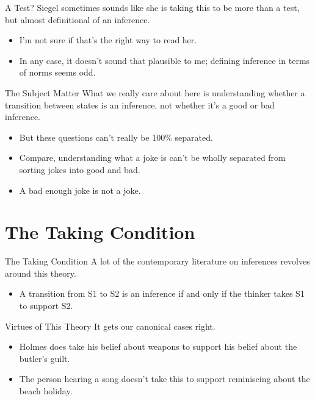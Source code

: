 \documentclass[
  17pt,
  letterpaper,
  ignorenonframetext,
  aspectratio=169,
  xcolor={dvipsnames}]{beamer}
\providecommand{\tightlist}{%
  \setlength{\itemsep}{0pt}\setlength{\parskip}{0pt}}\usepackage{longtable,booktabs,array}
\begin{document}
\begin{frame}{A Test?}
\protect\hypertarget{a-test-2}{}
Siegel sometimes sounds like she is taking this to be more than a test,
but almost definitional of an inference.

\begin{itemize}[<+->]
\tightlist
\item
  I'm not sure if that's the right way to read her.
\item
  In any case, it doesn't sound that plausible to me; defining inference
  in terms of norms seems odd.
\end{itemize}
\end{frame}

\begin{frame}{The Subject Matter}
\protect\hypertarget{the-subject-matter}{}
What we really care about here is understanding whether a transition
between states is an inference, not whether it's a good or bad
inference.

\begin{itemize}[<+->]
\tightlist
\item
  But these questions can't really be 100\% separated.
\item
  Compare, understanding what a joke is can't be wholly separated from
  sorting jokes into good and bad.
\item
  A bad enough joke is not a joke.
\end{itemize}
\end{frame}

\hypertarget{the-taking-condition}{%
\section{The Taking Condition}\label{the-taking-condition}}

\begin{frame}{The Taking Condition}
\protect\hypertarget{the-taking-condition-1}{}
A lot of the contemporary literature on inferences revolves around this
theory.

\begin{itemize}[<+->]
\tightlist
\item
  A transition from S1 to S2 is an inference if and only if the thinker
  takes S1 to support S2.
\end{itemize}
\end{frame}

\begin{frame}{Virtues of This Theory}
\protect\hypertarget{virtues-of-this-theory}{}
It gets our canonical cases right.

\begin{itemize}[<+->]
\tightlist
\item
  Holmes does take his belief about weapons to support his belief about
  the butler's guilt.
\item
  The person hearing a song doesn't take this to support reminiscing
  about the beach holiday.
\end{itemize}
\end{frame}
\end{document}
